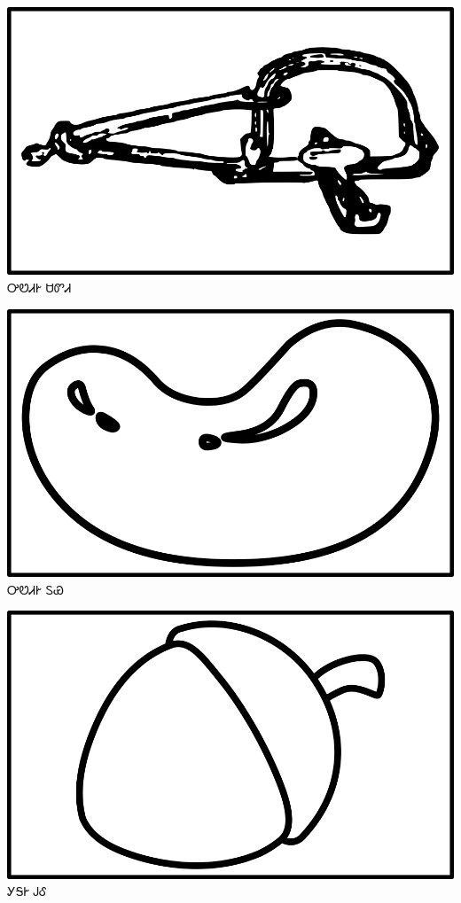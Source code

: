 \documentclass[avery5371]{flashcards}%
\begin{document}
    \begin{flashcard}{
        \includegraphics[width=0.95\columnwidth,height=.51\columnwidth,keepaspectratio]{../artwork/objects-neutral/sadvdi}
    }
        \Huge ᎤᏬᏗᎨ ᏌᏛᏗ
    \end{flashcard}

    \begin{flashcard}{
        \includegraphics[width=0.95\columnwidth,height=.51\columnwidth,keepaspectratio]{../artwork/objects-neutral/tuya}
    }
        \Huge ᎤᏬᏗᎨ ᏚᏯ
    \end{flashcard}

    \begin{flashcard}{
        \includegraphics[width=0.95\columnwidth,height=.51\columnwidth,keepaspectratio]{../artwork/objects-neutral/gule}
    }
        \Huge ᎩᎦᎨ ᎫᎴ
    \end{flashcard}
\end{document}
